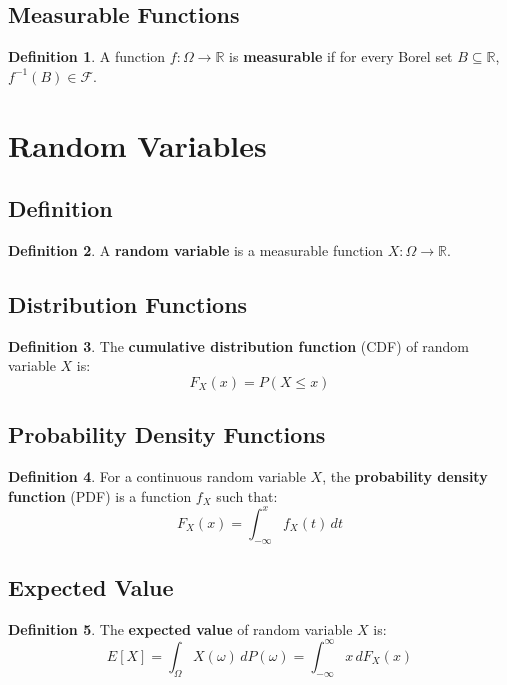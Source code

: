 \documentclass[11pt]{article}
\theoremstyle{definition}
\newtheorem{definition}{Definition}[section]
\begin{document}
\subsection{Measurable Functions}
\begin{definition}
A function $f: \Omega \to \mathbb{R}$ is \textbf{measurable} if for every Borel set $B \subseteq \mathbb{R}$, $f^{-1}(B) \in \mathcal{F}$.
\end{definition}

\section{Random Variables}

\subsection{Definition}
\begin{definition}
A \textbf{random variable} is a measurable function $X: \Omega \to \mathbb{R}$.
\end{definition}

\subsection{Distribution Functions}
\begin{definition}
The \textbf{cumulative distribution function} (CDF) of random variable $X$ is:
$$F_X(x) = P(X \leq x)$$
\end{definition}

\subsection{Probability Density Functions}
\begin{definition}
For a continuous random variable $X$, the \textbf{probability density function} (PDF) is a function $f_X$ such that:
$$F_X(x) = \int_{-\infty}^x f_X(t) \, dt$$
\end{definition}

\subsection{Expected Value}
\begin{definition}
The \textbf{expected value} of random variable $X$ is:
$$E[X] = \int_{\Omega} X(\omega) \, dP(\omega) = \int_{-\infty}^{\infty} x \, dF_X(x)$$
\end{definition}
\end{document}
